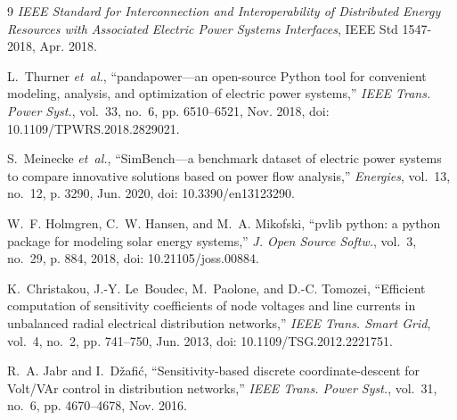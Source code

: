 \documentclass[conference]{IEEEtran}
\begin{document}
\begin{thebibliography}{9}
\emph{IEEE Standard for Interconnection and Interoperability of
Distributed Energy Resources with Associated Electric Power Systems
Interfaces}, IEEE Std 1547-2018, Apr. 2018.

L.~Thurner \emph{et~al.}, ``pandapower---an open-source Python tool for
convenient modeling, analysis, and optimization of electric power
systems,'' \emph{IEEE Trans. Power Syst.}, vol.~33, no.~6, pp.
6510--6521, Nov. 2018, doi: 10.1109/TPWRS.2018.2829021.

S.~Meinecke \emph{et~al.}, ``SimBench---a benchmark dataset of electric
power systems to compare innovative solutions based on power flow
analysis,'' \emph{Energies}, vol.~13, no.~12, p. 3290, Jun. 2020, doi:
10.3390/en13123290.

W.~F. Holmgren, C.~W. Hansen, and M.~A. Mikofski, ``pvlib python: a
python package for modeling solar energy systems,'' \emph{J. Open Source
Softw.}, vol.~3, no.~29, p. 884, 2018, doi: 10.21105/joss.00884.

K.~Christakou, J.-Y. Le~Boudec, M.~Paolone, and D.-C. Tomozei,
``Efficient computation of sensitivity coefficients of node voltages and
line currents in unbalanced radial electrical distribution networks,''
\emph{IEEE Trans. Smart Grid}, vol.~4, no.~2, pp. 741--750, Jun. 2013,
doi: 10.1109/TSG.2012.2221751.

R.~A. Jabr and I.~D\v{z}afi\'{c}, ``Sensitivity-based discrete
coordinate-descent for Volt/VAr control in distribution networks,''
\emph{IEEE Trans. Power Syst.}, vol.~31, no.~6, pp. 4670--4678, Nov.
2016.

\end{thebibliography}
\end{document}
